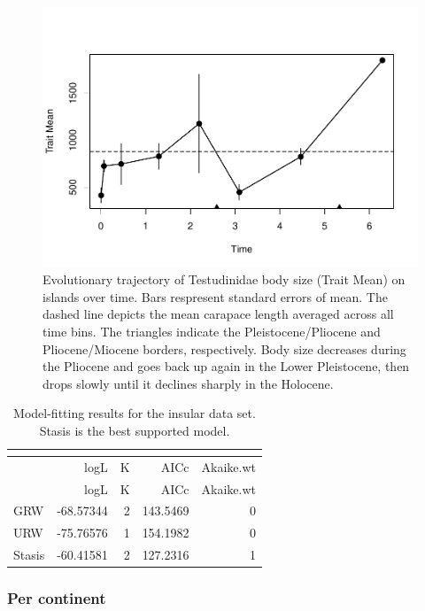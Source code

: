 \begin{figure}[H]
	\centering
	\includegraphics{MA_JJ_files/figure-latex/paleoTSI-1.pdf}
	\caption[PaleoTS plot of insular data set]{Evolutionary trajectory of Testudinidae body size (Trait Mean) on islands over time. Bars respresent standard errors of mean. The dashed line depicts the mean carapace length averaged across all time bins. The triangles indicate the Pleistocene/Pliocene and Pliocene/Miocene borders, respectively. Body size decreases during the Pliocene and goes back up again in the Lower Pleistocene, then drops slowly until it declines sharply in the Holocene.}
	\label{fig:pTSI}
\end{figure}

\begin{longtable}[]{@{}lrrrr@{}}
	\caption[Model fits for the insular data set]{Model-fitting results for the insular data set. Stasis is the best supported model.
	}
	\label{tab:pTSIEM}\tabularnewline
	\toprule
	& logL & K & AICc & Akaike.wt\tabularnewline
	\midrule
	\endfirsthead
	\toprule
	& logL & K & AICc & Akaike.wt\tabularnewline
	\midrule
	\endhead
	GRW & -68.57344 & 2 & 143.5469 & 0\tabularnewline
	URW & -75.76576 & 1 & 154.1982 & 0\tabularnewline
	Stasis & -60.41581 & 2 & 127.2316 & 1\tabularnewline
	\bottomrule
\end{longtable}

\FloatBarrier

\subsubsection{Per continent}\label{per-continent}

